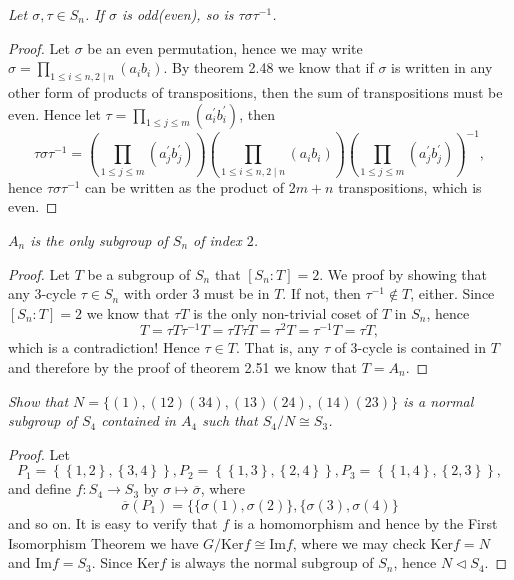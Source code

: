 \begin{problem}\em
Let $\sigma,\tau\in S_n$. If $\sigma$ is odd(even), so is $\tau\sigma\tau^{-1}$.
\end{problem}
\begin{proof}
Let $\sigma$ be an even permutation, hence we may write $\sigma=\prod_{1\le i\le n,2\mid n}(a_ib_i)$. By theorem 2.48 we know that if $\sigma$ is written in any other form of products of transpositions, then the sum of transpositions must be even. Hence let $\tau=\prod_{1\le j\le m}(a_i^\prime b_i^\prime)$, then 
$$
\tau \sigma \tau ^{-1}=\left( \prod_{1\le j\le m}{\left( a_{j}^{\prime}b_{j}^{\prime} \right)} \right) \left( \prod_{1\le i\le n,2\mid n}{\left( a_ib_i \right)} \right) \left( \prod_{1\le j\le m}{\left( a_{j}^{\prime}b_{j}^{\prime} \right)} \right) ^{-1},
$$
hence $\tau\sigma\tau^{-1}$ can be written as the product of $2m+n$ transpositions, which is even.
\end{proof}
\begin{problem}\em
$A_n$ is the only subgroup of $S_n$ of index $2$.
\end{problem}
\begin{proof}
Let $T$ be a subgroup of $S_n$ that $[S_n:T]=2$. We proof by showing that any $3$-cycle $\tau\in S_n$ with order $3$ must be in $T$. If not, then $\tau^{-1}\notin T$, either. Since $[S_n:T]=2$ we know that $\tau T$ is the only non-trivial coset of $T$ in $S_n$, hence 
$$T=\tau T\tau^{-1}T=\tau T\tau T=\tau^2 T=\tau^{-1} T=\tau T,$$
which is a contradiction! Hence $\tau\in T$. That is, any $\tau$ of $3$-cycle is contained in $T$ and therefore by the proof of theorem 2.51 we know that $T=A_n$.
\end{proof}
\begin{problem}\em
Show that $N=\{(1),(12)(34),(13)(24),(14)(23)\}$ is a normal subgroup of $S_4$ contained in $A_4$ such that $S_4/N\cong S_3$.
\end{problem}
\begin{proof}
Let 
$$
P_1=\left\{ \left\{ 1,2 \right\} ,\left\{ 3,4 \right\} \right\} ,P_2=\left\{ \left\{ 1,3 \right\} ,\left\{ 2,4 \right\} \right\} ,P_3=\left\{ \left\{ 1,4 \right\} ,\left\{ 2,3 \right\} \right\} ,
$$
and define $f:S_4\to S_3$ by $\sigma\mapsto\overline{\sigma}$, where 
$$\overline{\sigma}(P_1)=\{\{\sigma(1),\sigma(2)\},\{\sigma(3),\sigma(4)\}$$
and so on. It is easy to verify that $f$ is a homomorphism and hence by the First Isomorphism Theorem we have $G/\mathrm{Ker}f\cong\mathrm{Im}f$, where we may check $\mathrm{Ker}f=N$ and $\mathrm{Im}f=S_3$. Since $\mathrm{Ker}f$ is always the normal subgroup of $S_n$, hence $N\lhd S_4$. 
\end{proof}
